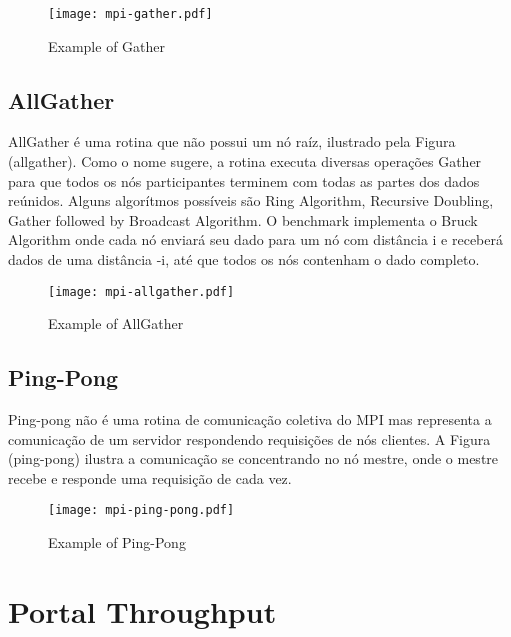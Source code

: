 			\begin{figure}[!tb]
				\centering%
				\caption{Example of \mpi Gather}%
				\label{fig:exp-gather}%
				\texttt{[image: mpi-gather.pdf]}%
			\end{figure}

		\subsection{AllGather}

			AllGather é uma rotina que não possui um nó raíz, ilustrado pela Figura (allgather).
			Como o nome sugere, a rotina executa diversas operações Gather para que todos os nós participantes terminem com todas as partes dos dados reúnidos.
			Alguns algorítmos possíveis são Ring Algorithm, Recursive Doubling, Gather followed by Broadcast Algorithm.
			O benchmark implementa o Bruck Algorithm onde cada nó enviará seu dado para um nó com distância i e receberá dados de uma distância -i, até que todos os nós contenham o dado completo.

			\begin{figure}[!tb]
				\centering%
				\caption{Example of \mpi AllGather}%
				\label{fig:exp-allgather}%
				\texttt{[image: mpi-allgather.pdf]}%
			\end{figure}

		\subsection{Ping-Pong}

			Ping-pong não é uma rotina de comunicação coletiva do MPI mas representa a comunicação de um servidor respondendo requisições de nós clientes.
			A Figura (ping-pong) ilustra a comunicação se concentrando no nó mestre, onde o mestre recebe e responde uma requisição de cada vez.

			\begin{figure}[!tb]
			    \centering%
			    \caption{Example of Ping-Pong}%
			    \label{fig:exp-ping-pong}%
			    \texttt{[image: mpi-ping-pong.pdf]}%
			\end{figure}

	\section{Portal Throughput}

